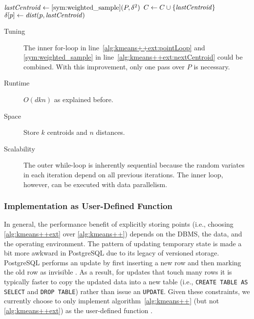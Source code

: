 \begin{algorithm} \label{alg:kmeans++ext}
\begin{algorithmic}[1]
	 \label{alg:kmeans++ext:for}
		\State $\mathit{lastCentroid} \leftarrow \ref{sym:weighted_sample}(P, \delta^2)$ \label{alg:kmeans++ext:nextCentroid} 
		\State $C \leftarrow C \cup \{ \mathit{lastCentroid} \}$
		 \label{alg:kmeans++ext:pointLoop}
				\State $\delta[p] \leftarrow \mathit{dist}(p, \mathit{lastCentroid})$
			\EndIf
		\EndFor
	\EndWhile
\end{algorithmic}
\end{algorithm}

\begin{description}
	\item[Tuning] \label{kmeans++ext:tuning} The inner for-loop in line~\ref{alg:kmeans++ext:pointLoop} and \ref{sym:weighted_sample} in line~\ref{alg:kmeans++ext:nextCentroid} could be combined. With this improvement, only one pass over $P$ is necessary.
	\item[Runtime] $O(dkn)$ as explained before.
	\item[Space] Store $k$ centroids and $n$ distances.
	\item[Scalability] The outer while-loop is inherently sequential because the random variates in each iteration depend on all previous iterations. The inner loop, however, can be executed with data parallelism.
\end{description}

\subsubsection{Implementation as User-Defined Function}

In general, the performance benefit of explicitly storing points (i.e., choosing \ref{alg:kmeans++ext} over \ref{alg:kmeans++}) depends on the DBMS, the data, and the operating environment. The pattern of updating temporary state is made a bit more awkward in PostgreSQL due to its legacy of versioned storage. PostgreSQL performs an update by first inserting a new row and then marking the old row as invisible \cite[Section~23.1.2]{postgres:9.1.3}. As a result, for updates that touch many rows it is typically faster to copy the updated data into a new table (i.e., \texttt{CREATE TABLE AS SELECT} and \texttt{DROP TABLE}) rather than issue an \texttt{UPDATE}. Given these constraints, we currently choose to only implement algorithm~\ref{alg:kmeans++} (but not \ref{alg:kmeans++ext}) as the user-defined function .

